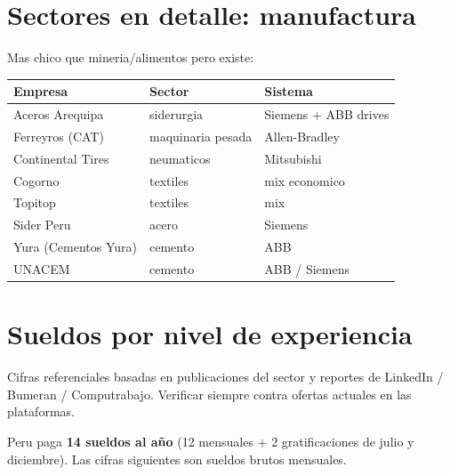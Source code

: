 \documentclass[11pt,a4paper,oneside]{report}
\begin{document}
\chapter{Sectores en detalle: manufactura}

Mas chico que mineria/alimentos pero existe:

\begin{center}
\begin{tabular}{lll}
\toprule
\textbf{Empresa} & \textbf{Sector} & \textbf{Sistema} \\
\midrule
Aceros Arequipa       & siderurgia        & Siemens + ABB drives \\
Ferreyros (CAT)       & maquinaria pesada & Allen-Bradley \\
Continental Tires     & neumaticos        & Mitsubishi \\
Cogorno               & textiles          & mix economico \\
Topitop               & textiles          & mix \\
Sider Peru            & acero             & Siemens \\
Yura (Cementos Yura)  & cemento           & ABB \\
UNACEM                & cemento           & ABB / Siemens \\
\bottomrule
\end{tabular}
\end{center}

\chapter{Sueldos por nivel de experiencia}

\begin{advertencia}
Cifras referenciales basadas en publicaciones del sector y reportes de
LinkedIn / Bumeran / Computrabajo. Verificar siempre contra ofertas
actuales en las plataformas.
\end{advertencia}

Peru paga \textbf{14 sueldos al año} (12 mensuales + 2 gratificaciones de
julio y diciembre). Las cifras siguientes son sueldos brutos mensuales.
\end{document}
